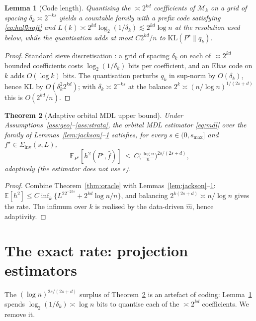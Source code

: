 \documentclass[11pt]{article}
\theoremstyle{plain}
\newtheorem{theorem}{Theorem}[section]
\newtheorem{lemma}[theorem]{Lemma}
\theoremstyle{definition}
\theoremstyle{remark}
\newcommand{\E}{\mathbb{E}}
\newcommand{\KL}{\mathrm{KL}}
\newcommand{\Siv}{\Sigma_{\mathrm{inv}}}
\begin{document}
\begin{lemma}[Code length]\label{lem:code}
Quantising the $\asymp2^{kd}$ coefficients of $\mathcal M_k$ on a grid of spacing
$\delta_k\asymp2^{-ks}$ yields a countable family with a prefix code satisfying
\eqref{eq:halfkraft} and
$L(k)\asymp2^{kd}\log_2(1/\delta_k)\lesssim2^{kd}\log n$ at the resolution used
below, while the quantisation adds at most $C2^{kd}/n$ to $\KL(P^\star\|q_k)$.
\end{lemma}

\begin{proof}
Standard sieve discretisation \cite{barroncover}: a grid of spacing $\delta_k$ on
each of $\asymp2^{kd}$ bounded coefficients costs $\log_2(1/\delta_k)$ bits per
coefficient, and an Elias code on $k$ adds $O(\log k)$ bits. The quantisation
perturbs $q_k$ in sup-norm by $O(\delta_k)$, hence $\KL$ by $O(\delta_k^2 2^{kd})$;
with $\delta_k\asymp2^{-ks}$ at the balance $2^k\asymp(n/\log n)^{1/(2s+d)}$ this is
$O(2^{kd}/n)$.
\end{proof}

\begin{theorem}[Adaptive orbital MDL upper bound]\label{thm:upper}
Under Assumptions~\ref{ass:geo}--\ref{ass:strata}, the orbital MDL estimator
\eqref{eq:mdl} over the family of Lemmas~\ref{lem:jackson}--\ref{lem:code}
satisfies, for every $s\in(0,s_{\max}]$ and $f^\star\in\Siv(s,L)$,
\[
\E_{P^\star}[h^2(P^\star,\widehat f)]\ \le\ C\Big(\tfrac{\log n}{n}\Big)^{2s/(2s+d)},
\]
adaptively (the estimator does not use $s$).
\end{theorem}

\begin{proof}
Combine Theorem~\ref{thm:oracle} with Lemmas~\ref{lem:jackson}--\ref{lem:code}:
$\E[h^2]\le C\inf_k\{L^22^{-2ks}+2^{kd}\log n/n\}$, and balancing
$2^{k(2s+d)}\asymp n/\log n$ gives the rate. The infimum over $k$ is realised by the
data-driven $\widehat m$, hence adaptivity.
\end{proof}

\section{The exact rate: projection estimators}\label{sec:exact}

The $(\log n)^{2s/(2s+d)}$ surplus of Theorem~\ref{thm:upper} is an artefact of
coding: Lemma~\ref{lem:code} spends $\log_2(1/\delta_k)\asymp\log n$ bits to
quantise each of the $\asymp2^{kd}$ coefficients. We remove it.
\end{document}
